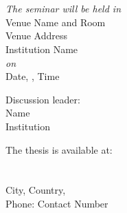 \documentclass[10pt,a4paper,onecolumn,english]{book}
\begin{document}
\frontmatter


\renewcommand{\thepage}{}

\thispagestyle{empty} %
\begin{center}
\end{center}



\begin{center} {\LARGE \textbf{\mytitle}}
\ifx\mysubtitle\undefined
\else
  \\
  \vspace{0.4cm}
  \textit{\large\mysubtitle}
\fi
\end{center}

\vspace{5mm}
\begin{center}
\textsc{\large\authorname} \\
\end{center}
\vspace{5mm}

\begin{center}
\textit{The seminar will be held in}\\
\vskip 2mm
Venue Name and Room \\
Venue Address\\
Institution Name\\
\vskip 1mm
\textit{on}\\
\vskip 1mm
Date, \currentyear, Time\\

\vspace{1cm}

Discussion leader:\\
Name\\
Institution
\end{center}

\vspace{1cm}


\begin{center}
The thesis is available at:\\
\mydepartment\\
\chalIgu\\
City, Country, \currentyear\\
\vspace{1cm}
Phone: Contact Number
\end{center}
\end{document}
